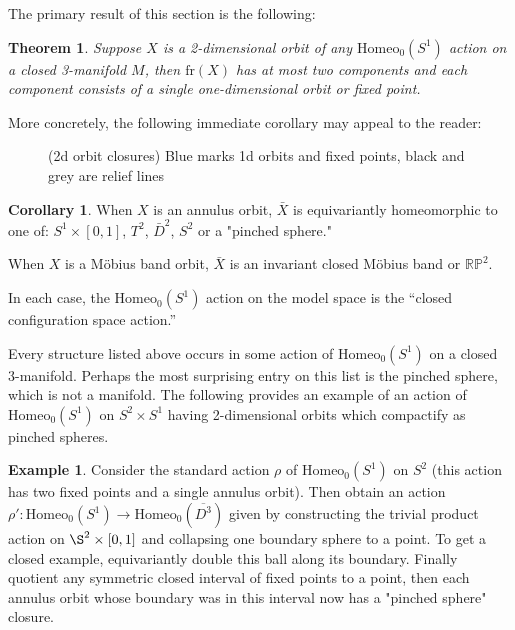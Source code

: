 \documentclass[10pt, oneside]{article}
\newcommand{\RP}{\mathbb{RP}}
\newcommand{\homeo}[1][S^1]{\text{Homeo}_0(#1)}
\newcommand{\cl}[1]{\overline{#1}}
\newtheorem{thm}{Theorem}[section]
\theoremstyle{definition}
\newtheorem{eg}{Example}[section]
\newtheorem{cor}{Corollary}[section]
\theoremstyle{definition}
\begin{document}
The primary result of this section is the following:

\begin{thm}\label{thm:2d-orbit-cpctification}
    Suppose $X$ is a 2-dimensional orbit of any $\homeo$ action on a closed 3-manifold $M$, then $\text{fr}(X)$ has at most two components and each component consists of a single one-dimensional orbit or fixed point.
\end{thm}

More concretely, the following immediate corollary
may appeal to the reader:

\begin{figure}[b]
    \centering
    
    \caption{(2d orbit closures) Blue marks 1d orbits and fixed points, black and grey are relief lines}
    \label{fig:2d-orbit-compactifications}
\end{figure}

\begin{cor}\label{cor:2d-orbit-closures}
    When $X$ is an annulus orbit, $\bar{X}$ is equivariantly homeomorphic to one of: $S^1\times [0,1]$, $T^2$, $\bar{D}^2$, $S^2$ or a "pinched sphere."

    When $X$ is a M\"{o}bius band orbit, $\bar{X}$ is an invariant closed M\"{o}bius band or $\RP^2$.

    In each case, the $\homeo$ action on the model space is the ``closed configuration space action.''
\end{cor}

Every structure listed above occurs in some action of $\homeo$ on a closed 3-manifold. Perhaps the most surprising entry on this list is the pinched sphere, which is not a manifold. The following provides an example of an action of $\homeo$ on $S^2 \times S^1$ having 2-dimensional orbits which compactify as pinched spheres.

\begin{eg}
    Consider the standard action $\rho$ of $\homeo[S^1]$ on $S^2$ (this action has two fixed points and a single annulus orbit). Then obtain an action $\rho':\homeo[S^1]\to \homeo[\cl{D^3}]$ given by constructing the trivial product action on $\S^2\times [0,1]$ and collapsing one boundary sphere to a point. To get a closed example, equivariantly double this ball along its boundary. Finally quotient any symmetric closed interval of fixed points to a point, then each annulus orbit whose boundary was in this interval now has a "pinched sphere" closure.
\end{eg}
\end{document}
